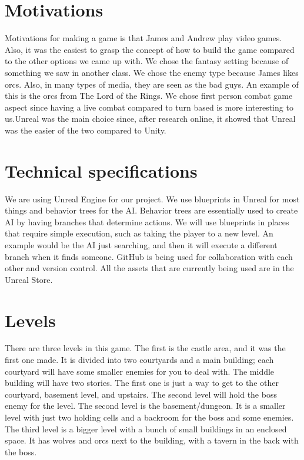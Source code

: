 \documentclass{sigchi}
\begin{document}
\section{Motivations}
Motivations for making a game is that James and Andrew play video games. Also, it was the easiest to grasp the concept of how to build the game compared to the other options we came up with. We chose the fantasy setting because of something we saw in another class. We chose the enemy type because James likes orcs. Also, in many types of media, they are seen as the bad guys. An example of this is the orcs from The Lord of the Rings. We chose first person combat game aspect since having a live combat compared to turn based is more interesting to us.Unreal was the main choice since, after research online, it showed that Unreal was the easier of the two compared to Unity.
\section{Technical specifications}
We are using Unreal Engine for our project. We use blueprints in Unreal for most things and behavior trees for the AI. Behavior trees are essentially used to create AI by having branches that determine actions. We will use blueprints in places that require simple execution, such as taking the player to a new level. An example would be the AI just searching, and then it will execute a different branch when it finds someone. GitHub is being used for collaboration with each other and version control. All the assets that are currently being used are in the Unreal Store.
\section{Levels}
There are three levels in this game. The first is the castle area, and it was the first one made. It is divided into two courtyards and a main building; each courtyard will have some smaller enemies for you to deal with. The middle building will have two stories. The first one is just a way to get to the other courtyard, basement level, and upstairs. The second level will hold the boss enemy for the level. The second level is the basement/dungeon. It is a smaller level with just two holding cells and a backroom for the boss and some enemies. The third level is a bigger level with a bunch of small buildings in an enclosed space. It has wolves and orcs next to the building, with a tavern in the back with the boss.
\end{document}
